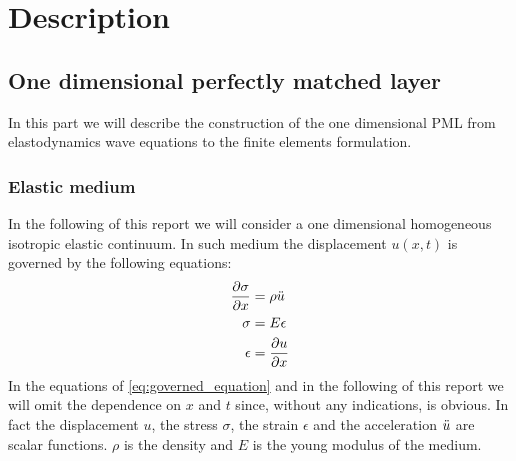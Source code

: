 \section{Description}
\subsection{One dimensional perfectly matched layer}
\label{part:describ}
In this part we will describe the construction of the one dimensional PML from elastodynamics wave equations to the finite elements formulation.
\subsubsection{Elastic medium}
In the following of this report we will consider a one dimensional homogeneous isotropic elastic continuum. In such medium the displacement $u(x,t)$ is governed by the following equations:
\begin{equation}
  \begin{aligned}
    \frac{\partial \sigma}{\partial x} &= \rho \Ddot{u}\\        
    \sigma &= E \epsilon \\
    \epsilon &= \frac{\partial u}{\partial x}
  \end{aligned}
  \label{eq:governed_equation}
\end{equation}
In the equations of \ref{eq:governed_equation} and in the following of this report we will omit the dependence on $x$ and $t$ since, without any indications, is obvious. In fact the displacement $u$, the stress $\sigma$, the strain $\epsilon$ and the acceleration $\Ddot{u}$ are scalar functions. $\rho$ is the density and $E$ is the young modulus of the medium. 
